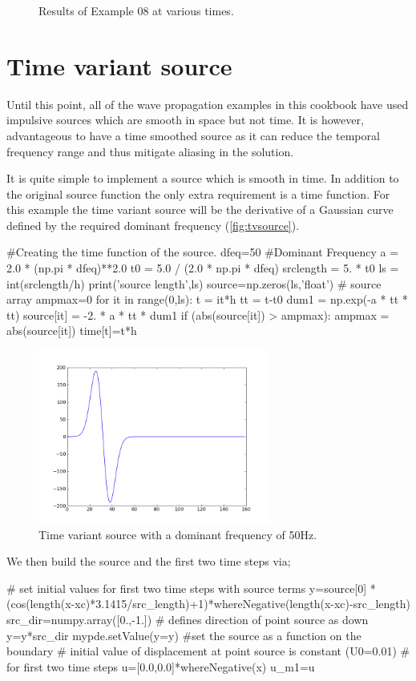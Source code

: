 \begin{figure}[htp]
{\label{fig:ex08pw950}
}
\label{fig:ex08pw}
\caption{Results of Example 08 at various times.}
\end{figure}
\clearpage

\section{Time variant source}

Until this point, all of the wave propagation examples in this cookbook have
used impulsive sources which are smooth in space but not time. It is however,
advantageous to have a time smoothed source as it can reduce the temporal
frequency range and thus mitigate aliasing in the solution. 

It is quite 
simple to implement a source which is smooth in time. In addition to the
original source function the only extra requirement is a time function. For
this example the time variant source will be the derivative of a Gaussian curve
defined by the required dominant frequency (\autoref{fig:tvsource}).
\begin{python}
#Creating the time function of the source.
dfeq=50 #Dominant Frequency
a = 2.0 * (np.pi * dfeq)**2.0
t0 = 5.0 / (2.0 * np.pi * dfeq)
srclength = 5. * t0
ls = int(srclength/h)
print('source length',ls)
source=np.zeros(ls,'float') # source array
ampmax=0
for it in range(0,ls):
    t = it*h
    tt = t-t0
    dum1 = np.exp(-a * tt * tt)
    source[it] = -2. * a * tt * dum1
    if (abs(source[it]) > ampmax):
        ampmax = abs(source[it])
    time[t]=t*h
\end{python}
\begin{figure}[ht]
\centering
\includegraphics[width=3in]{figures/source.png}
\caption{Time variant source with a dominant frequency of 50Hz.}
\label{fig:tvsource}
\end{figure}

We then build the source and the first two time steps via;
\begin{python}
# set initial values for first two time steps with source terms
y=source[0]
*(cos(length(x-xc)*3.1415/src_length)+1)*whereNegative(length(x-xc)-src_length)
src_dir=numpy.array([0.,-1.]) # defines direction of point source as down
y=y*src_dir
mypde.setValue(y=y) #set the source as a function on the boundary
# initial value of displacement at point source is constant (U0=0.01)
# for first two time steps
u=[0.0,0.0]*whereNegative(x)
u_m1=u
\end{python}


